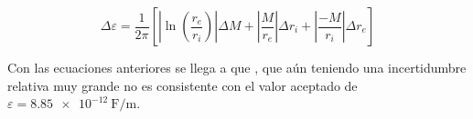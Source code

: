 \begin{equation}
    \label{ec:epsilon:error-epsilon}
    \Delta \varepsilon = \frac{1}{2\pi} \left[ 
            \left| \ln\left(\frac{r_e}{r_i}\right) \right| \Delta M +
            \left| \frac{M}{r_e} \right| \Delta r_i + 
            \left| \frac{-M}{r_i} \right| \Delta r_e
        \right]
\end{equation}

Con las ecuaciones anteriores se llega a que , que
aún teniendo una incertidumbre relativa muy grande no es consistente con el
valor aceptado de $\varepsilon = \SI{8.85e-12}{\farad\per\meter}$.

